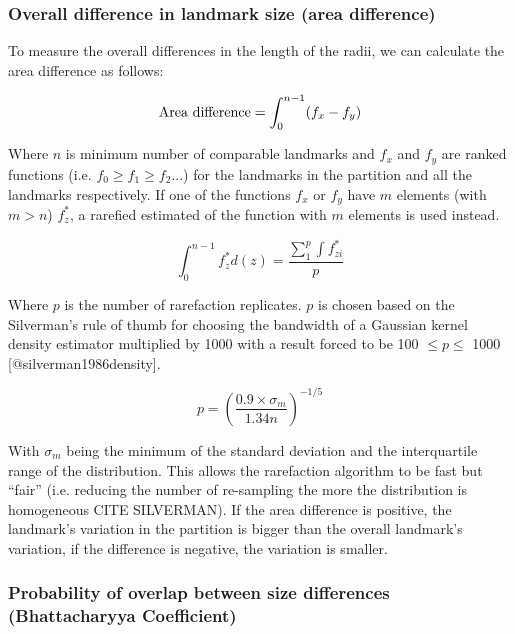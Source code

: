 \documentclass[a4paper,11pt]{article}
\begin{document}
\subsubsection{Overall difference in landmark size (area difference)}

To measure the overall differences in the length of the radii, we can calculate the area difference as follows:

\begin{equation}
\label{area_diff}
    \textnormal{Area difference} = \int_{0}^{n-1} (f_{x} - f_{y})
\end{equation}

\noindent Where $n$ is minimum number of comparable landmarks and $f_{x}$ and $f_{y}$ are ranked functions (i.e. $f_{0} \geq f_{1} \geq f_{2} ...$) for the landmarks in the partition and all the landmarks respectively.
If one of the functions $f_{x}$ or $f_{y}$ have $m$ elements (with $m > n$) $f^{*}_{z}$, a rarefied estimated of the function with $m$ elements is used instead.

\begin{equation}
\label{are_estimation}
    \int_{0}^{n-1}f^*_{z}d(z) = \frac{\sum_1^p\int f^*_{zi}}{p}
\end{equation}

\noindent Where $p$ is the number of rarefaction replicates.
$p$ is chosen based on the Silverman's rule of thumb for choosing the bandwidth of a Gaussian kernel density estimator multiplied by 1000 with a result forced to be 100 $\leq p \leq$ 1000 [@silverman1986density].

\begin{equation}
\label{Silverman_rule}
    p=\left(\frac{0.9\times \sigma_{m} }{1.34n}\right)^{-1/5}
\end{equation}

\noindent With $\sigma_{m}$ being the minimum of the standard deviation and the interquartile range of the distribution.
This allows the rarefaction algorithm to be fast but ``fair'' (i.e. reducing the number of re-sampling the more the distribution is homogeneous CITE SILVERMAN).
If the area difference is positive, the landmark's variation in the partition is bigger than the overall landmark's variation, if the difference is negative, the variation is smaller.


\subsubsection{Probability of overlap between size differences (Bhattacharyya Coefficient)}
\end{document}
